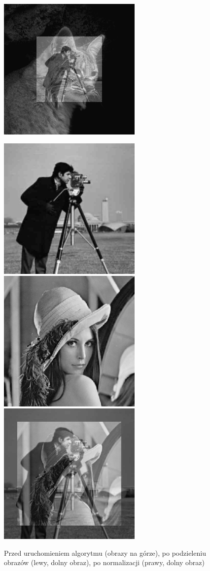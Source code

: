 \documentclass[a4paper,12pt]{book}
\begin{document}
\begin{figure}[H]
	\includegraphics[width=7cm, height=7cm]{2-5/divide-gray-images-cat-photoman-norm.png}
\end{figure}
\begin{figure}[H]
	\caption{Przed uruchomieniem algorytmu (obrazy na górze), po podzieleniu obrazów (lewy, dolny obraz), po normalizacji (prawy, dolny obraz)}
	\includegraphics[width=7cm, height=7cm]{man-unmodified.jpg}
	\includegraphics[width=7cm, height=7cm]{lena-unmodified.png}
	\includegraphics[width=7cm, height=7cm]{2-5/divide-gray-images-photoman-lena.png}

\end{figure}
\end{document}

